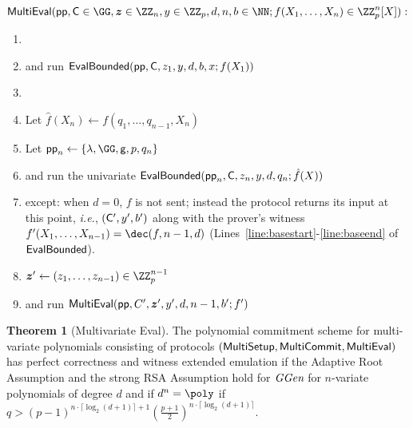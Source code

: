 \documentclass{article}
\theoremstyle{definition}
\newtheorem{theorem}{Theorem}
\begin{document}
 \begin{mdframed}
\begin{minipage}{\textwidth}
			$\pro{MultiEval}(\crs, \gr{C}\in \GG, \boldsymbol{z}\in \ZZ_n,y \in \ZZ_p, d,n,b \in \NN; f(X_1,\dots,X_n)\in \ZZ_p^n[X]) :$ 			\begin{enumerate}[nolistsep]
			\item {} 
			\item \pcind[1] \prover and \verifier run $\textsf{{EvalBounded}}(\textsf{pp},\mathsf{C},z_1,y,d,b,x;f(X_1))$ 
			\item \pcelse
			\item \pcind[1] Let $\hat{f}(X_n)\gets f(q_1,\dots,q_{n-1},X_n)$
			\item \pcind[1] Let $\crs_n \gets \{\lambda,\GG,\gr{g},p,q_n\}$
			\item \pcind[1] \prover and \verifier run the univariate $\textsf{{EvalBounded}}(\textsf{pp}_n,\mathsf{C},z_n,y,d,q_n;\hat{f}(X))$
			\item \pcind[2] except: when $d=0$, $f$ is not sent; instead the protocol returns its input at this point, \emph{i.e.}, $(\mathsf{C}',y',b')$ along with the prover's witness $f'(X_1,\dots,X_{n-1})=\dec(f,n-1,d)$ (Lines~\ref{line:basestart}-\ref{line:baseend} of $\textsf{{EvalBounded}}$). 
			\item \pcind[1]$\boldsymbol{z}'\gets (z_1,\dots,z_{n-1})\in \ZZ_p^{n-1}$
			\item \pcind[1]\prover and \verifier run $\textsf{{MultiEval}}(\textsf{pp},C',\boldsymbol{z}',y',d,n-1,b';f')$
		    \end{enumerate}
      \end{minipage}
\end{mdframed}
\begin{theorem}[Multivariate Eval]
	The polynomial commitment scheme for multi-variate polynomials consisting of protocols $(\textsf{{MultiSetup}},\textsf{{MultiCommit}},\textsf{{MultiEval}})$ has perfect correctness and witness extended emulation if the Adaptive Root Assumption and the strong RSA Assumption hold for $\textit{GGen}$ for $n$-variate polynomials of degree $d$ and if $d^n=\poly$ if $q>(p-1)^{n\cdot \lceil \log_2(d+1)\rceil+1}(\frac{p+1}{2})^{n \cdot \lceil \log_2(d+1)\rceil}$.
\end{theorem}
\end{document}
